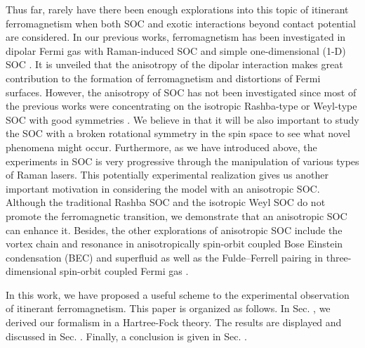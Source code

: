 \documentclass[twocolumn,english,pra,superscriptaddress]{revtex4-1}
\begin{document}
Thus far, rarely have there been enough explorations into this topic of itinerant ferromagnetism when both SOC and exotic interactions beyond contact potential are considered. In our previous works, ferromagnetism has been investigated in dipolar Fermi gas with Raman-induced SOC \cite{PhysRevA.105.053312} and simple  one-dimensional (1-D) SOC \cite{20301}. It is unveiled that the anisotropy of the dipolar interaction makes great contribution to the formation of ferromagnetism and distortions of Fermi surfaces. However, the anisotropy of SOC has not been investigated since most of the previous works were concentrating on the isotropic Rashba-type or Weyl-type SOC with good symmetries \cite{PhysRevB.94.115121,PhysRevB.96.235425,VIVASC2020166113}. We believe in that it will be also important to study the SOC with a broken rotational symmetry in the spin space to see what novel phenomena might occur. Furthermore, as we have introduced above, the experiments in SOC is very progressive through the manipulation of various types of Raman lasers. This potentially experimental realization gives us another important motivation in considering the model with an anisotropic SOC. Although the traditional Rashba SOC and the isotropic Weyl SOC do not promote the ferromagnetic transition, we demonstrate that an anisotropic SOC can enhance it. Besides, the other explorations of anisotropic SOC include the vortex chain and resonance in anisotropically spin-orbit coupled Bose Einstein condensation (BEC) \cite{PhysRevA.98.013617,PhysRevA.78.023616,PhysRevA.87.063630,liao2018anisotropic} and superfluid as well as the Fulde–Ferrell pairing in three-dimensional spin-orbit coupled Fermi gas \cite{PhysRevA.88.013612,liu2015three}. \par 
In this work, we have proposed a useful scheme to the experimental observation of itinerant ferromagnetism. This paper is organized as follows. In Sec. \uppercase\expandafter{}, we derived our formalism in a Hartree-Fock theory. The results are displayed and discussed in Sec. \uppercase\expandafter{}. Finally, a conclusion is given in Sec. \uppercase\expandafter{}.
\end{document}
